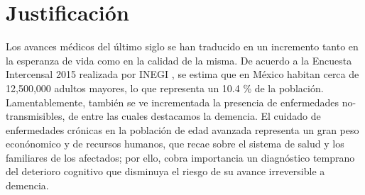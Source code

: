 \documentclass[12pt,a4paper]{mitthesis}
\begin{document}
%


\section{Justificaci\'on}

Los avances m\'edicos del \'ultimo siglo se han traducido en un incremento tanto en la esperanza de 
vida como en la calidad de la misma. 
De acuerdo a la Encuesta Intercensal 2015 realizada por INEGI \cite{Intercensal15}, se estima que
en M\'exico habitan cerca de 12,500,000 adultos mayores, lo que representa un 10.4 \%  de la 
poblaci\'on.
Lamentablemente, tambi\'en se ve incrementada la presencia de enfermedades no-transmisibles, de 
entre las cuales destacamos la demencia.
El cuidado de enfermedades cr\'onicas en la poblaci\'on de edad avanzada representa un gran peso 
econ\'onomico y de recursos humanos, que recae sobre el sistema de salud y los familiares de los 
afectados; por ello, cobra importancia un diagn\'ostico temprano del deterioro cognitivo que 
disminuya el riesgo de su avance irreversible a demencia.
\end{document}
